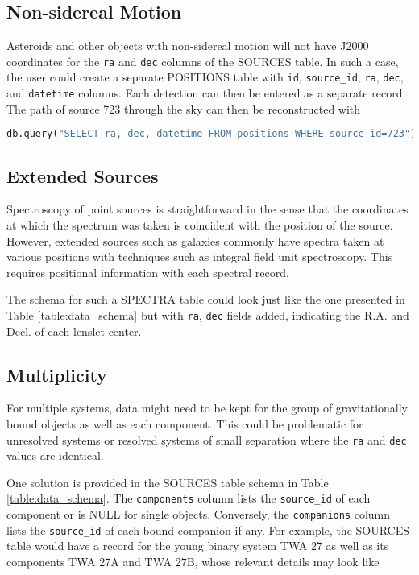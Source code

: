 \documentclass[iop,revtex4,natbib209]{emulateapj}
\begin{document}
\subsection{Non-sidereal Motion}
Asteroids and other objects with non-sidereal motion will not have J2000 coordinates for the \texttt{ra} and \texttt{dec} columns of the SOURCES table. In such a case, the user could create a separate POSITIONS table with \texttt{id}, \texttt{source\_id}, \texttt{ra}, \texttt{dec}, and \texttt{datetime} columns. Each detection can then be entered as a separate record. The path of source 723 through the sky can then be reconstructed with 

\begin{lstlisting}[language=Python]
db.query("SELECT ra, dec, datetime FROM positions WHERE source_id=723")
\end{lstlisting}

\subsection{Extended Sources}
Spectroscopy of point sources is straightforward in the sense that the coordinates at which the spectrum was taken is coincident with the position of the source. However, extended sources such as galaxies commonly have spectra taken at various positions with techniques such as integral field unit spectroscopy. This requires positional information with each spectral record.

The schema for such a SPECTRA table could look just like the one presented in Table \ref{table:data_schema} but with \texttt{ra}, \texttt{dec} fields added, indicating the R.A. and Decl. of each lenslet center.

\subsection{Multiplicity}
For multiple systems, data might need to be kept for the group of gravitationally bound objects as well as each component. This could be problematic for unresolved systems or resolved systems of small separation where the \texttt{ra} and \texttt{dec} values are identical. 

One solution is provided in the SOURCES table schema in Table \ref{table:data_schema}. The \texttt{components} column lists the \texttt{source\_id} of each component or is NULL for single objects. Conversely, the \texttt{companions} column lists the \texttt{source\_id} of each bound companion if any. For example, the SOURCES table would have a record for the young binary system TWA 27 as well as its components TWA 27A and TWA 27B, whose relevant details may look like
\end{document}
